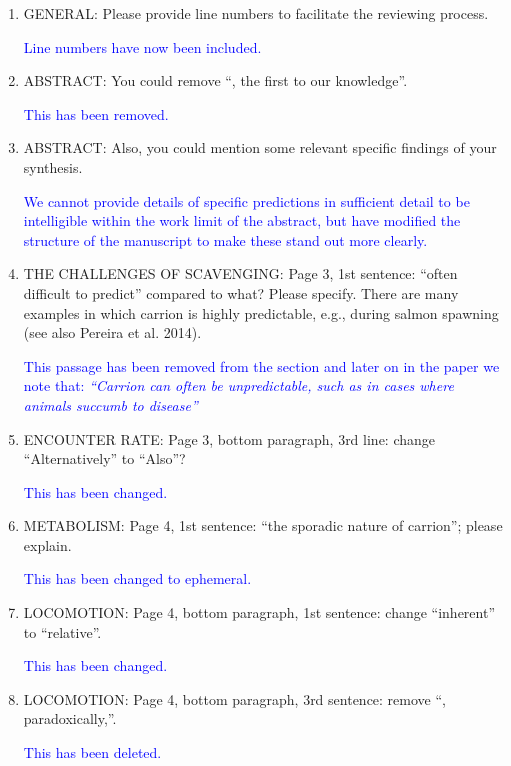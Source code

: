 \documentclass[12pt,letterpaper]{article}
\begin{document}
{\begin{enumerate}

\item{GENERAL:} Please provide line numbers to facilitate the reviewing process.

\textcolor{blue}{Line numbers have now been included. }

\item{ABSTRACT:} You could remove ``, the first to our knowledge''.

\textcolor{blue}{This has been removed.}

\item{ABSTRACT:} Also, you could mention some relevant specific findings of your synthesis.

\textcolor{blue}{We cannot provide details of specific predictions in sufficient detail to be intelligible within the work limit of the abstract, but have modified the structure of the manuscript to make these stand out more clearly.} 


\item{THE CHALLENGES OF SCAVENGING:} Page 3, 1st sentence: ``often difficult to predict'' compared to what? Please specify. There are many examples in which carrion is highly predictable, e.g., during salmon spawning (see also Pereira et al. 2014).

\textcolor{blue}{This passage has been removed from the section and later on in the paper we note that: \textit{``Carrion can often be unpredictable, such as in cases where animals succumb to disease''}}

\item{ENCOUNTER RATE:} Page 3, bottom paragraph, 3rd line: change ``Alternatively'' to ``Also''?

\textcolor{blue}{This has been changed.}

\item{METABOLISM:} Page 4, 1st sentence: ``the sporadic nature of carrion''; please explain.

\textcolor{blue}{This has been changed to ephemeral.}

\item{LOCOMOTION:} Page 4, bottom paragraph, 1st sentence: change ``inherent'' to ``relative''.

\textcolor{blue}{This has been changed.}

\item{LOCOMOTION:} Page 4, bottom paragraph, 3rd sentence: remove ``, paradoxically,''.

\textcolor{blue}{This has been deleted.}


\end{enumerate}}
\end{document}
